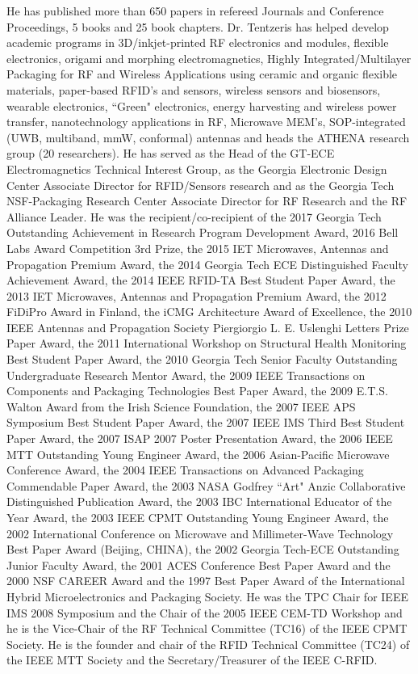 \documentclass[journal]{IEEEtran}
\begin{document}
\begin{IEEEbiography}
He has published more than 650 papers in refereed Journals and Conference Proceedings, 5 books and 25 book chapters. Dr. Tentzeris has helped develop academic programs in 3D/inkjet-printed RF electronics and modules, flexible electronics, origami and morphing electromagnetics, Highly Integrated/Multilayer Packaging for RF and Wireless Applications using ceramic and organic flexible materials, paper-based RFID's and sensors, wireless sensors and biosensors, wearable electronics, ``Green" electronics, energy harvesting and wireless power transfer, nanotechnology applications in RF, Microwave MEM's, SOP-integrated (UWB, multiband, mmW, conformal) antennas and heads the ATHENA research group (20 researchers). He has served as the Head of the GT-ECE Electromagnetics Technical Interest Group, as the Georgia Electronic Design Center Associate Director for RFID/Sensors research and as the Georgia Tech NSF-Packaging Research Center Associate Director for RF Research and the RF Alliance Leader.  He was the recipient/co-recipient of the 2017 Georgia Tech Outstanding Achievement in Research Program Development Award, 2016 Bell Labs Award Competition 3rd Prize, the 2015  IET Microwaves, Antennas and Propagation Premium Award, the 2014 Georgia Tech ECE Distinguished Faculty Achievement Award, the 2014 IEEE RFID-TA Best Student Paper Award, the 2013 IET Microwaves, Antennas and Propagation Premium Award, the 2012 FiDiPro Award in Finland, the iCMG Architecture Award of Excellence, the 2010 IEEE Antennas and Propagation Society Piergiorgio L. E. Uslenghi Letters Prize Paper Award, the 2011 International Workshop on Structural Health Monitoring Best Student Paper Award, the 2010 Georgia Tech Senior Faculty Outstanding Undergraduate Research Mentor Award,  the 2009 IEEE Transactions on Components and Packaging Technologies Best Paper Award, the 2009 E.T.S. Walton Award from the Irish Science Foundation, the 2007 IEEE APS Symposium Best Student Paper Award, the 2007 IEEE IMS Third Best Student Paper Award, the 2007 ISAP 2007 Poster Presentation Award, the 2006 IEEE MTT Outstanding Young Engineer Award, the 2006 Asian-Pacific Microwave Conference Award, the 2004 IEEE Transactions on Advanced Packaging Commendable Paper Award, the 2003 NASA Godfrey ``Art" Anzic Collaborative Distinguished Publication Award, the 2003 IBC International Educator of the Year Award, the 2003 IEEE CPMT Outstanding Young Engineer Award, the 2002 International Conference on Microwave and Millimeter-Wave Technology Best Paper Award (Beijing, CHINA), the 2002 Georgia Tech-ECE Outstanding Junior Faculty Award, the 2001 ACES Conference Best Paper Award and the 2000 NSF CAREER Award and the 1997 Best Paper Award of the International Hybrid Microelectronics and Packaging Society. He was the TPC Chair for IEEE IMS 2008 Symposium and the Chair of the 2005 IEEE CEM-TD Workshop and he is the Vice-Chair of the RF Technical Committee (TC16) of the IEEE CPMT Society. He is the founder and chair of the RFID Technical Committee (TC24) of the IEEE MTT Society and the Secretary/Treasurer of the IEEE C-RFID. 


\end{IEEEbiography}
\end{document}
